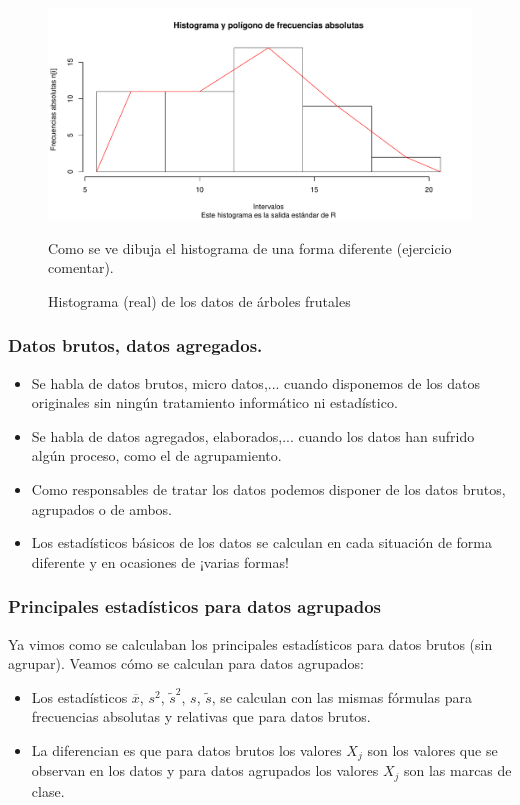 \begin{frame}[fragile]
\begin{figure}
\label{histofruta}
\includegraphics{./dibujos/01/-013}
\caption{Histograma (real) de los datos de árboles frutales}

Como se ve dibuja el histograma de una forma diferente (ejercicio comentar).
\end{figure}
\end{frame}

\begin{frame}
\frametitle{Datos brutos, datos agregados.}
\begin{itemize}
\item Se habla de datos brutos, micro datos,... cuando disponemos de  los datos originales  sin ningún tratamiento  informático ni estadístico.
\item Se habla de datos agregados, elaborados,... cuando los datos han  sufrido algún proceso, como el de agrupamiento.
\item Como responsables de tratar los datos podemos disponer de los datos brutos, agrupados o de ambos. 
\item  Los estadísticos básicos de los datos se calculan en  cada situación de forma  diferente y en ocasiones de ¡varias formas!
\end{itemize}
\end{frame}

\begin{frame}
\frametitle{Principales estadísticos para datos agrupados}

Ya vimos como se calculaban los principales estadísticos para datos brutos (sin agrupar). Veamos cómo se calculan para datos agrupados:

\begin{itemize}
\item Los estadísticos $\overline{x}$, $s^2$, $\tilde{s}^2$, $s$, $\tilde{s}$, se calculan  con las mismas fórmulas para frecuencias absolutas y relativas que para datos  brutos.
\item  La diferencian es que para datos brutos los valores $X_j$ son los  valores que se observan en los datos y para datos agrupados los valores $X_j$ son las marcas de clase.
\end{itemize}
\end{frame}

